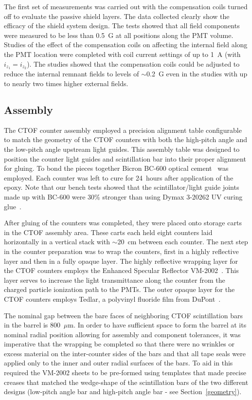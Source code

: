 \documentclass{elsart}
\begin{document}
The first set of measurements was carried out with the compensation coils turned off to evaluate
the passive shield layers. The data collected clearly show the efficacy of the shield system design.
The tests showed that all field components were measured to be less than 0.5~G at all positions
along the PMT volume. Studies of the effect of the compensation coils on affecting the internal field
along the PMT location were completed with coil current settings of up to 1~A (with $i_{z_1} = i_{z_2}$).
The studies showed that the compensation coils could be adjusted to reduce the internal remnant
fields to levels of $\sim$0.2~G even in the studies with up to nearly two times higher external fields.

\subsection{Assembly}
\label{assembly}
           
The CTOF counter assembly employed a precision alignment table configurable to match the geometry
of the CTOF counters with both the high-pitch angle and the low-pitch angle upstream light guides. This
assembly table was designed to position the counter light guides and scintillation bar into their proper
alignment for gluing. To bond the pieces together Bicron BC-600 optical cement~\cite{bc600-ref} was
employed. Each counter was left to cure for 24~hours after application of the epoxy. Note that our
bench tests showed that the scintillator/light guide joints made up with BC-600 were 30\% stronger
than using Dymax 3-20262 UV curing glue~\cite{dymax}.

After gluing of the counters was completed, they were placed onto storage carts in the CTOF assembly
area. These carts each held eight counters laid horizontally in a vertical stack with $\sim$20~cm
between each counter. The next step in the counter preparation was to wrap the counters, first in a highly
reflective layer and then in a fully opaque layer. The highly reflective wrapping layer for the CTOF counters
employs the Enhanced Specular Reflector VM-2002~\cite{vm2002-ref}. This layer serves to increase the
light transmittance along the counter from the charged particle ionization path to the PMTs. The outer
opaque layer for the CTOF counters employs Tedlar, a polyvinyl fluoride film from DuPont~\cite{dupont-ref}.

The nominal gap between the bare faces of neighboring CTOF scintillation bars in the barrel is
800~$\mu$m. In order to have sufficient space to form the barrel at its nominal radial position allowing
for assembly and component tolerances, it was imperative that the wrapping be completed so that there
were no wrinkles or excess material on the inter-counter sides of the bars and that all tape seals were
applied only to the inner and outer radial surfaces of the bars. To aid in this required the VM-2002 sheets
to be pre-formed using templates that made precise creases that matched the wedge-shape of the
scintillation bars of the two different designs (low-pitch angle bar and high-pitch angle bar - see
Section~\ref{geometry}).
\end{document}
